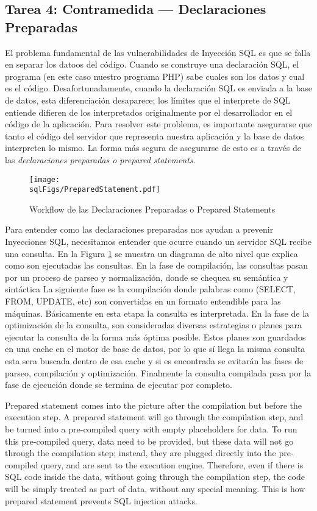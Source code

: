 \subsection{Tarea 4: Contramedida --- Declaraciones Preparadas} 

El problema fundamental de las vulnerabilidades de Inyección SQL es que se falla en separar los datoos del código. Cuando se construye una declaración SQL, el programa (en este caso nuestro programa PHP) sabe cuales son los datos y cual es el código. 
Desafortunadamente, cuando la declaración SQL es enviada a la base de datos, esta diferenciación desaparece; los límites que el interprete de SQL entiende difieren de los interpretados originalmente por el desarrollador en el código de la aplicación.
Para resolver este problema, es importante asegurarse que tanto el código del servidor que representa nuestra aplicación y la base de datos interpreten lo mismo. La forma más segura de asegurarse de esto es a través de las \textit{declaraciones preparadas o prepared statements}. 

\begin{figure}
\centering
\texttt{[image: \\sqlFigs/PreparedStatement.pdf]}
\caption{Workflow de las Declaraciones Preparadas o Prepared Statements}
\label{sql:fig:preparedstatement}
\end{figure}

Para entender como las declaraciones preparadas nos ayudan a prevenir Inyecciones SQL, necesitamos entender que ocurre cuando un servidor SQL recibe una consulta.
En la Figura \ref{sql:fig:preparedstatement} se muestra un diagrama de alto nivel que explica como son ejecutadas las consultas.
En la fase de compilación, las consultas pasan por un proceso de parseo y normalización, donde se chequea su semántica y sintáctica
La siguiente fase es la compilación donde palabras como (SELECT, FROM, UPDATE, etc) son convertidas en un formato entendible para las máquinas. Básicamente en esta etapa la consulta es interpretada.
En la fase de la optimización de la consulta, son consideradas diversas estrategias o planes para ejecutar la consulta de la forma más óptima posible. Estos planes son guardados en una cache en el motor de base de datos, por lo que sí llega la misma consulta esta sera buscada dentro de esa cache y si es encontrada se evitarán las fases de parseo, compilación y optimización. Finalmente la consulta compilada pasa por la fase de ejecución donde se termina de ejecutar por completo.


Prepared statement comes into the picture after the compilation but before the execution step. 
A prepared statement will go through the compilation step, and be turned into
a pre-compiled query with empty placeholders for data. To run this pre-compiled query,
data need to be provided, but these data will not go through the compilation step; instead,
they are plugged directly into the pre-compiled query, and are sent to the execution engine.
Therefore, even if there is SQL code inside the data, without going through the compilation
step, the code will be simply treated as part of data, without any special meaning.  
This is how prepared statement prevents SQL injection attacks.


